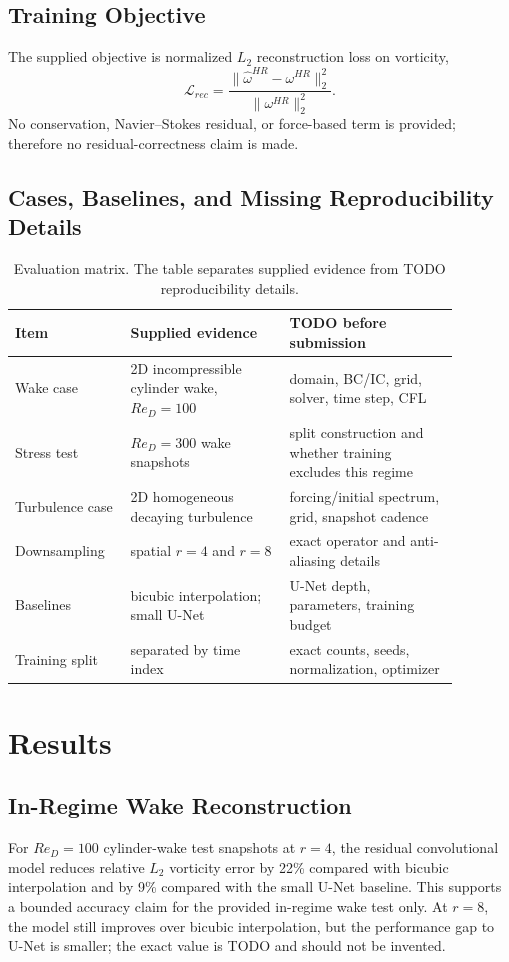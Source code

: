 \documentclass[11pt]{article}
\begin{document}
\subsection{Training Objective}
The supplied objective is normalized $L_2$ reconstruction loss on vorticity,
\begin{equation}
    \mathcal{L}_{rec}=\frac{\|\hat{\omega}^{HR}-\omega^{HR}\|_2^2}{\|\omega^{HR}\|_2^2}.
\end{equation}
No conservation, Navier--Stokes residual, or force-based term is provided; therefore no residual-correctness claim is made.

\subsection{Cases, Baselines, and Missing Reproducibility Details}
\begin{table}[t]
\centering
\caption{Evaluation matrix. The table separates supplied evidence from TODO reproducibility details.}
\begin{tabular}{p{0.22\linewidth}p{0.32\linewidth}p{0.34\linewidth}}
\toprule
Item & Supplied evidence & TODO before submission \\
\midrule
Wake case & 2D incompressible cylinder wake, $Re_D=100$ & domain, BC/IC, grid, solver, time step, CFL \\
Stress test & $Re_D=300$ wake snapshots & split construction and whether training excludes this regime \\
Turbulence case & 2D homogeneous decaying turbulence & forcing/initial spectrum, grid, snapshot cadence \\
Downsampling & spatial $r=4$ and $r=8$ & exact operator and anti-aliasing details \\
Baselines & bicubic interpolation; small U-Net & U-Net depth, parameters, training budget \\
Training split & separated by time index & exact counts, seeds, normalization, optimizer \\
\bottomrule
\end{tabular}
\end{table}

\section{Results}
\subsection{In-Regime Wake Reconstruction}
For $Re_D=100$ cylinder-wake test snapshots at $r=4$, the residual convolutional model reduces relative $L_2$ vorticity error by 22\% compared with bicubic interpolation and by 9\% compared with the small U-Net baseline. This supports a bounded accuracy claim for the provided in-regime wake test only. At $r=8$, the model still improves over bicubic interpolation, but the performance gap to U-Net is smaller; the exact value is TODO and should not be invented.
\end{document}
